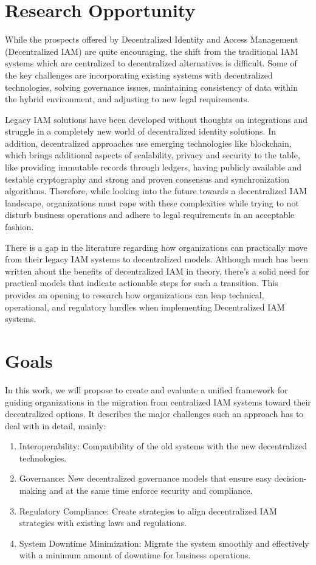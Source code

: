 \section{Research Opportunity}
\label{sub:research_opportunity}
While the prospects offered by Decentralized Identity and Access Management (Decentralized IAM) are quite encouraging, the shift from the traditional IAM systems which are centralized to decentralized alternatives is difficult. Some of the key challenges are incorporating existing systems with decentralized technologies, solving governance issues, maintaining consistency of data within the hybrid environment, and adjusting to new legal requirements.

Legacy IAM solutions have been developed without thoughts on integrations and struggle in a completely new world of decentralized identity solutions. In addition, decentralized approaches use emerging technologies like blockchain, which brings additional aspects of scalability, privacy and security to the table, like providing immutable records through ledgers, having publicly available and testable cryptography and strong and proven consensus and synchronization algorithms. Therefore, while looking into the future towards a decentralized IAM landscape, organizations must cope with these complexities while trying to not disturb business operations and adhere to legal requirements in an acceptable fashion.

There is a gap in the literature regarding how organizations can practically move from their legacy IAM systems to decentralized models. Although much has been written about the benefits of decentralized IAM in theory, there’s a solid need for practical models that indicate actionable steps for such a transition. This provides an opening to research how organizations can leap technical, operational, and regulatory hurdles when implementing Decentralized IAM systems.

\section{Goals}
\label{sub:goals}
In this work, we will propose to create and evaluate a unified framework for guiding organizations in the migration from centralized IAM systems toward their decentralized options. It describes the major challenges such an approach has to deal with in detail, mainly: 
\begin{enumerate}
  \item Interoperability: Compatibility of the old systems with the new decentralized technologies.
  \item Governance: New decentralized governance models that ensure easy decision-making and at the same time enforce security and compliance.
  \item Regulatory Compliance: Create strategies to align decentralized IAM strategies with existing laws and regulations.
  \item System Downtime Minimization: Migrate the system smoothly and effectively with a minimum amount of downtime for business operations.
\end{enumerate}